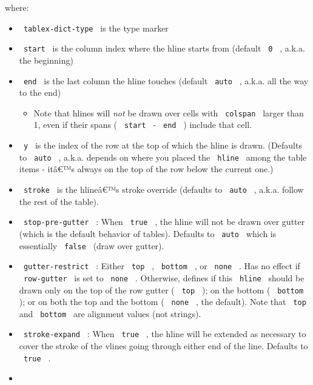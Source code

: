 \begin{enumerate}
  where:

  \begin{itemize}
  \tightlist
  \item
    \texttt{\ tablex-dict-type\ } is the type marker
  \item
    \texttt{\ start\ } is the column index where the hline starts from
    (default \texttt{\ 0\ } , a.k.a. the beginning)
  \item
    \texttt{\ end\ } is the last column the hline touches (default
    \texttt{\ auto\ } , a.k.a. all the way to the end)

    \begin{itemize}
    \tightlist
    \item
      Note that hlines will \emph{not} be drawn over cells with
      \texttt{\ colspan\ } larger than 1, even if their spans (
      \texttt{\ start\ } - \texttt{\ end\ } ) include that cell.
    \end{itemize}
  \item
    \texttt{\ y\ } is the index of the row at the top of which the hline
    is drawn. (Defaults to \texttt{\ auto\ } , a.k.a. depends on where
    you placed the \texttt{\ hline\ } among the table items - itâ€™s
    always on the top of the row below the current one.)
  \item
    \texttt{\ stroke\ } is the hlineâ€™s stroke override (defaults to
    \texttt{\ auto\ } , a.k.a. follow the rest of the table).
  \item
    \texttt{\ stop-pre-gutter\ } : When \texttt{\ true\ } , the hline
    will not be drawn over gutter (which is the default behavior of
    tables). Defaults to \texttt{\ auto\ } which is essentially
    \texttt{\ false\ } (draw over gutter).
  \item
    \texttt{\ gutter-restrict\ } : Either \texttt{\ top\ } ,
    \texttt{\ bottom\ } , or \texttt{\ none\ } . Has no effect if
    \texttt{\ row-gutter\ } is set to \texttt{\ none\ } . Otherwise,
    defines if this \texttt{\ hline\ } should be drawn only on the top
    of the row gutter ( \texttt{\ top\ } ); on the bottom (
    \texttt{\ bottom\ } ); or on both the top and the bottom (
    \texttt{\ none\ } , the default). Note that \texttt{\ top\ } and
    \texttt{\ bottom\ } are alignment values (not strings).
  \item
    \texttt{\ stroke-expand\ } : When \texttt{\ true\ } , the hline will
    be extended as necessary to cover the stroke of the vlines going
    through either end of the line. Defaults to \texttt{\ true\ } .
  \item

\end{itemize}
\end{enumerate}
